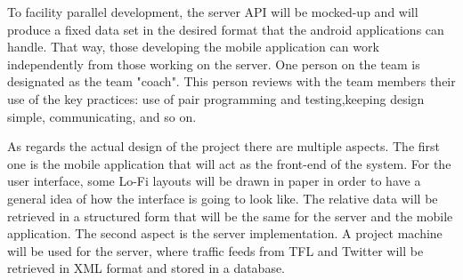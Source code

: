 To facility parallel development, the server API will be mocked-up and will produce a fixed data set in the desired format that the android applications can handle. That way, those developing the mobile application can work independently from those working on the server. One person on the team is designated as the team "coach". This person reviews with the team members their use of the key practices: use of pair programming and testing,keeping design simple, communicating, and so on.

As regards the actual design of the project there are multiple aspects. The first one is the mobile application that will act as the front-end of the system. For the user interface, some Lo-Fi layouts will be drawn in paper in order to have a general idea of how the interface is going to look like. The relative data will be retrieved in a structured form that will be the same for the server and the mobile application. The second aspect is the server implementation. A project machine will be used for the server, where traffic feeds from TFL and Twitter will be retrieved in XML format and stored in a database.

